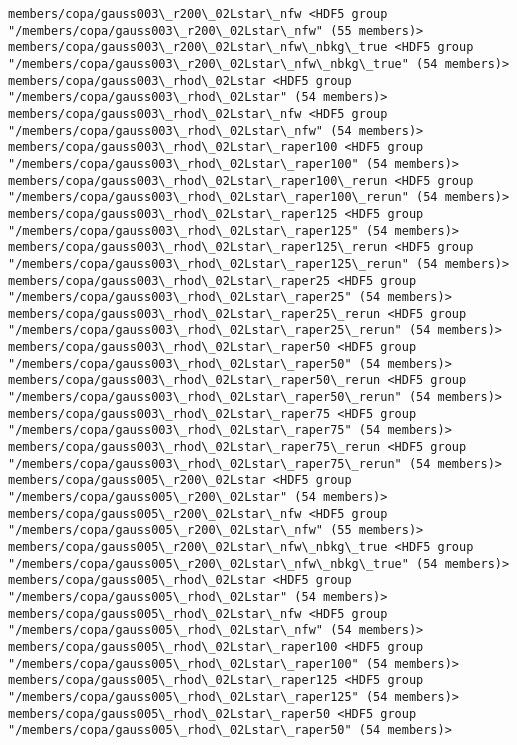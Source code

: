 \documentclass[11pt]{article}
\begin{document}
\begin{Verbatim}[commandchars=\\\{\}]
members/copa/gauss003\_r200\_02Lstar\_nfw <HDF5 group "/members/copa/gauss003\_r200\_02Lstar\_nfw" (55 members)>
members/copa/gauss003\_r200\_02Lstar\_nfw\_nbkg\_true <HDF5 group "/members/copa/gauss003\_r200\_02Lstar\_nfw\_nbkg\_true" (54 members)>
members/copa/gauss003\_rhod\_02Lstar <HDF5 group "/members/copa/gauss003\_rhod\_02Lstar" (54 members)>
members/copa/gauss003\_rhod\_02Lstar\_nfw <HDF5 group "/members/copa/gauss003\_rhod\_02Lstar\_nfw" (54 members)>
members/copa/gauss003\_rhod\_02Lstar\_raper100 <HDF5 group "/members/copa/gauss003\_rhod\_02Lstar\_raper100" (54 members)>
members/copa/gauss003\_rhod\_02Lstar\_raper100\_rerun <HDF5 group "/members/copa/gauss003\_rhod\_02Lstar\_raper100\_rerun" (54 members)>
members/copa/gauss003\_rhod\_02Lstar\_raper125 <HDF5 group "/members/copa/gauss003\_rhod\_02Lstar\_raper125" (54 members)>
members/copa/gauss003\_rhod\_02Lstar\_raper125\_rerun <HDF5 group "/members/copa/gauss003\_rhod\_02Lstar\_raper125\_rerun" (54 members)>
members/copa/gauss003\_rhod\_02Lstar\_raper25 <HDF5 group "/members/copa/gauss003\_rhod\_02Lstar\_raper25" (54 members)>
members/copa/gauss003\_rhod\_02Lstar\_raper25\_rerun <HDF5 group "/members/copa/gauss003\_rhod\_02Lstar\_raper25\_rerun" (54 members)>
members/copa/gauss003\_rhod\_02Lstar\_raper50 <HDF5 group "/members/copa/gauss003\_rhod\_02Lstar\_raper50" (54 members)>
members/copa/gauss003\_rhod\_02Lstar\_raper50\_rerun <HDF5 group "/members/copa/gauss003\_rhod\_02Lstar\_raper50\_rerun" (54 members)>
members/copa/gauss003\_rhod\_02Lstar\_raper75 <HDF5 group "/members/copa/gauss003\_rhod\_02Lstar\_raper75" (54 members)>
members/copa/gauss003\_rhod\_02Lstar\_raper75\_rerun <HDF5 group "/members/copa/gauss003\_rhod\_02Lstar\_raper75\_rerun" (54 members)>
members/copa/gauss005\_r200\_02Lstar <HDF5 group "/members/copa/gauss005\_r200\_02Lstar" (54 members)>
members/copa/gauss005\_r200\_02Lstar\_nfw <HDF5 group "/members/copa/gauss005\_r200\_02Lstar\_nfw" (55 members)>
members/copa/gauss005\_r200\_02Lstar\_nfw\_nbkg\_true <HDF5 group "/members/copa/gauss005\_r200\_02Lstar\_nfw\_nbkg\_true" (54 members)>
members/copa/gauss005\_rhod\_02Lstar <HDF5 group "/members/copa/gauss005\_rhod\_02Lstar" (54 members)>
members/copa/gauss005\_rhod\_02Lstar\_nfw <HDF5 group "/members/copa/gauss005\_rhod\_02Lstar\_nfw" (54 members)>
members/copa/gauss005\_rhod\_02Lstar\_raper100 <HDF5 group "/members/copa/gauss005\_rhod\_02Lstar\_raper100" (54 members)>
members/copa/gauss005\_rhod\_02Lstar\_raper125 <HDF5 group "/members/copa/gauss005\_rhod\_02Lstar\_raper125" (54 members)>
members/copa/gauss005\_rhod\_02Lstar\_raper50 <HDF5 group "/members/copa/gauss005\_rhod\_02Lstar\_raper50" (54 members)>

\end{Verbatim}
\end{document}
